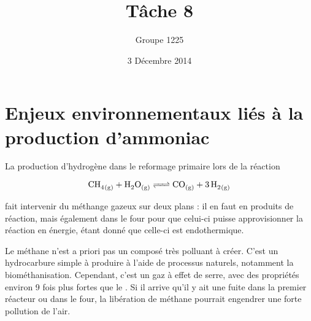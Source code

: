 \documentclass[a4paper, oneside, 12pt]{article}
\title{Tâche 8}
\author{Groupe 1225}
\date{3 Décembre 2014}
\begin{document}
\maketitle

\section*{Enjeux environnementaux liés à la production d'ammoniac}

La production d'hydrogène dans le reformage primaire lors de la réaction

\begin{equation*}
	\ce{CH4_{(g)} + H2O_{(g)} <=> CO_{(g)} + 3 \, H2_{(g)}} 
\end{equation*}

fait intervenir du méthange gazeux sur deux plans : il en faut en produits de réaction, 
mais également dans le four pour que celui-ci puisse approvisionner la réaction en énergie, étant donné que celle-ci est endothermique. 

Le méthane n'est a priori pas un composé très polluant à créer. C'est un hydrocarbure simple à produire à l'aide de processus naturels, notamment la biométhanisation. 
Cependant, c'est un gaz à effet de serre, avec des propriétés environ 9 fois plus fortes que le . 
Si il arrive qu'il y ait une fuite dans la premier réacteur ou dans le four, la libération de méthane pourrait engendrer une forte pollution de l'air.\cite{electrolyse}

\printbibliography
\end{document}
